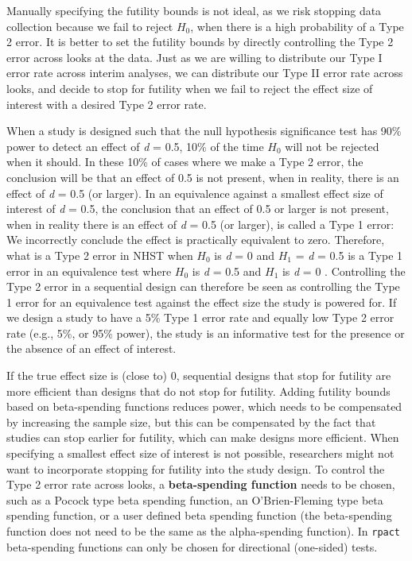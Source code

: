 \documentclass[
  oneside]{krantz}
\begin{document}
Manually specifying the futility bounds is not ideal, as we risk stopping data collection because we fail to reject \(H_0\), when there is a high probability of a Type 2 error. It is better to set the futility bounds by directly controlling the Type 2 error across looks at the data. Just as we are willing to distribute our Type I error rate across interim analyses, we can distribute our Type II error rate across looks, and decide to stop for futility when we fail to reject the effect size of interest with a desired Type 2 error rate.

When a study is designed such that the null hypothesis significance test has 90\% power to detect an effect of \emph{d} = 0.5, 10\% of the time \(H_0\) will not be rejected when it should. In these 10\% of cases where we make a Type 2 error, the conclusion will be that an effect of 0.5 is not present, when in reality, there is an effect of \emph{d} = 0.5 (or larger). In an equivalence against a smallest effect size of interest of \emph{d} = 0.5, the conclusion that an effect of 0.5 or larger is not present, when in reality there is an effect of \emph{d} = 0.5 (or larger), is called a Type 1 error: We incorrectly conclude the effect is practically equivalent to zero. Therefore, what is a Type 2 error in NHST when \(H_0\) is \emph{d} = 0 and \(H_1\) = \emph{d} = 0.5 is a Type 1 error in an equivalence test where \(H_0\) is \emph{d} = 0.5 and \(H_1\) is \emph{d} = 0 \citep{jennison_group_2000}. Controlling the Type 2 error in a sequential design can therefore be seen as controlling the Type 1 error for an equivalence test against the effect size the study is powered for. If we design a study to have a 5\% Type 1 error rate and equally low Type 2 error rate (e.g., 5\%, or 95\% power), the study is an informative test for the presence or the absence of an effect of interest.

If the true effect size is (close to) 0, sequential designs that stop for futility are more efficient than designs that do not stop for futility. Adding futility bounds based on beta-spending functions reduces power, which needs to be compensated by increasing the sample size, but this can be compensated by the fact that studies can stop earlier for futility, which can make designs more efficient. When specifying a smallest effect size of interest is not possible, researchers might not want to incorporate stopping for futility into the study design. To control the Type 2 error rate across looks, a \textbf{beta-spending function} needs to be chosen, such as a Pocock type beta spending function, an O'Brien-Fleming type beta spending function, or a user defined beta spending function (the beta-spending function does not need to be the same as the alpha-spending function). In \texttt{rpact} beta-spending functions can only be chosen for directional (one-sided) tests.
\end{document}
